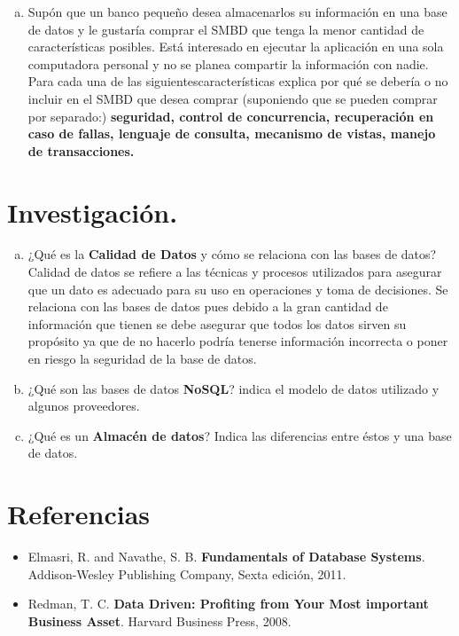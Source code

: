 \documentclass[letterpaper,12pt]{article}
\begin{document}
\begin{enumerate}[a. ]
            \item Supón que un banco pequeño desea almacenarlos su información en una base de datos y le gustaría comprar el SMBD que tenga la menor cantidad de características posibles. Está interesado en ejecutar la aplicación en una sola computadora personal y no se planea compartir la información con nadie. Para cada una de las siguientescaracterísticas explica por qué se debería o no incluir en el SMBD que desea comprar (suponiendo que se pueden comprar por separado:) \textbf{seguridad, control de concurrencia, recuperación en caso de fallas, lenguaje de consulta, mecanismo de vistas, manejo de transacciones.}
          \end{enumerate}

            \section{Investigación.}
            \begin{enumerate}[a)]

            \item ¿Qué es la \textbf{Calidad de Datos} y cómo se relaciona con las bases de datos? \\
        	Calidad de datos se refiere a las técnicas y procesos utilizados para asegurar que un dato es adecuado para su uso en operaciones y toma de decisiones. Se relaciona con las bases de datos pues debido a la gran cantidad de información que tienen se debe asegurar que todos los datos sirven su propósito ya que de no hacerlo podría tenerse información incorrecta o poner en riesgo la seguridad de la base de datos.

            \item ¿Qué son las bases de datos \textbf{NoSQL}? indica el modelo de datos utilizado y algunos proveedores.
            \item ¿Qué es un \textbf{Almacén de datos}? Indica las diferencias entre éstos y una base de datos.

            \end{enumerate}

            \section*{Referencias}
            \begin{itemize}

            	\item Elmasri, R. and Navathe, S. B. \textbf{Fundamentals of Database Systems}. Addison-Wesley Publishing Company, Sexta edición, 2011.
            	\item Redman, T. C. \textbf{Data Driven: Profiting from Your Most important Business Asset}. Harvard Business Press, 2008.

            \end{itemize}

            
\end{document}
